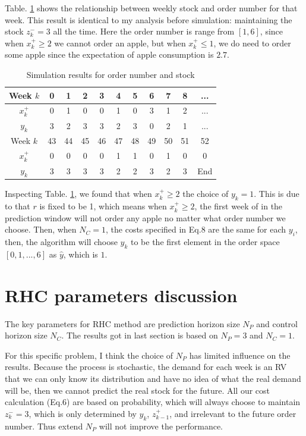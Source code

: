 \documentclass[letterpaper, 10 pt, conference]{ieeeconf}
\begin{document}
Table. \ref{52WeeksSimulation} shows the relationship between weekly stock and order number for that week. This result is identical to my analysis before simulation: maintaining the stock $z_k^- = 3$ all the time. Here the order number is range from $[1,6]$, since when $x_k^+ \geq 2$ we cannot order an apple, but when $x_k^+ \leq 1$, we do need to order some apple since the expectation of apple consumption is $2.7$.
\begin{table}[h]
  \caption{Simulation results for order number and stock}
  \label{52WeeksSimulation}
  \begin{center}
    \begin{tabular}{|c||c|c|c|c|c|c|c|c|c|c|}
      \hline
      \rowcolor{mygray}
      Week $k$  & 0   & 1 & 2 & 3 & 4 & 5 &6 &7 &8 &...\\
      \hline
      $x_k^+$  & 0       & 1 & 0 & 0 & 1 & 0 &3 &1 &2 &...\\
      \hline
      $y_k$ & 3       & 2 & 3 & 3 & 2 & 3  &0 &2 &1 &...\\
      \hline
      \rowcolor{mygray}
      Week $k$   &43 & 44   & 45 & 46 & 47 & 48 & 49 &50 &51  &52\\
      \hline
      $x_k^+$ & 0       & 0 & 0 & 0 & 1 & 1  &0 &1 &0 &0\\
      \hline
      $y_k$ & 3       & 3 & 3 & 3 & 2 & 2  &3 &2 &3 &End\\
      \hline
    \end{tabular}
  \end{center}
\end{table}

Inspecting Table. \ref{52WeeksSimulation}, we found that when $x_k^+ \geq 2$ the choice of $y_k = 1$. This is due to that $r$ is fixed to be 1, which means when $x_k^+ \geq 2$, the first week of in the prediction window will not order any apple no matter what order number we choose. Then, when $N_C = 1$, the costs specified in Eq.8 are the same for each $y_i$, then, the algorithm will choose $y_k$ to be the first element in the order space $[0,1,...,6]$ as $\hat{y}$, which is $1$.
\section{RHC parameters discussion}
The key parameters for RHC method are prediction horizon size $N_P$ and control horizon size $N_C$. The results got in last section is based on $N_P =3$ and $N_C=1$.

For this specific problem, I think the choice of $N_P$ has limited influence on the results. Because the process is stochastic, the demand for each week is an RV that we can only know its distribution and have no idea of what the real demand will be, then we cannot predict the real stock for the future. All our cost calculation (Eq.6) are based on probability, which will always choose to maintain $z_k^- =3$, which is only determined by $y_k$, $z_{k-1}^+ $, and irrelevant to the future order number. Thus extend $N_P$ will not improve the performance.
\end{document}
